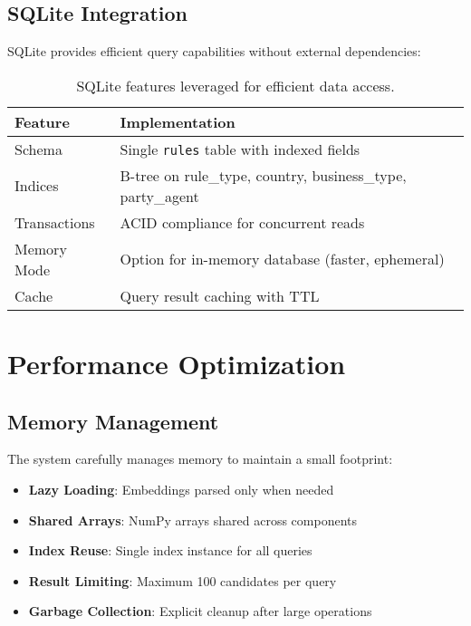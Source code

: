 \subsection{SQLite Integration}

SQLite provides efficient query capabilities without external dependencies:

\begin{table}[ht]
\centering
\begin{tabular}{ll}
\toprule
\textbf{Feature} & \textbf{Implementation} \\
\midrule
Schema & Single \texttt{rules} table with indexed fields \\
Indices & B-tree on rule\_type, country, business\_type, party\_agent \\
Transactions & ACID compliance for concurrent reads \\
Memory Mode & Option for in-memory database (faster, ephemeral) \\
Cache & Query result caching with TTL \\
\bottomrule
\end{tabular}
\caption{SQLite features leveraged for efficient data access.}
\label{tab:sqlite-features}
\end{table}

\section{Performance Optimization}

\subsection{Memory Management}

The system carefully manages memory to maintain a small footprint:

\begin{itemize}[leftmargin=*,itemsep=2pt,topsep=2pt]
  \item \textbf{Lazy Loading}: Embeddings parsed only when needed
  \item \textbf{Shared Arrays}: NumPy arrays shared across components
  \item \textbf{Index Reuse}: Single index instance for all queries
  \item \textbf{Result Limiting}: Maximum 100 candidates per query
  \item \textbf{Garbage Collection}: Explicit cleanup after large operations
\end{itemize}

